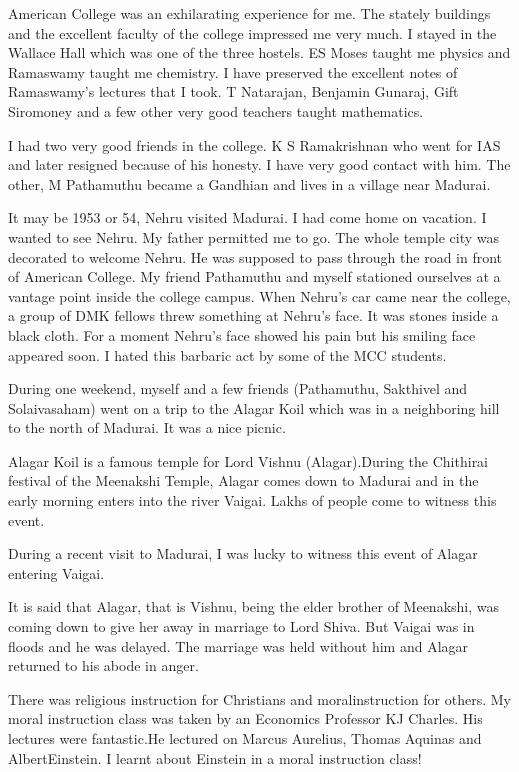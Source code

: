 American College was an exhilarating experience for me. The stately 
buildings and the excellent faculty of the college impressed me very 
much. I stayed in the Wallace Hall which was one of the three hostels. 
ES Moses taught me physics and Ramaswamy taught me chemistry. I have 
preserved the excellent notes of Ramaswa\-my's lectures that I took. T 
Natarajan, Benjamin Guna\-raj, Gift Siromoney and a few other very good 
teachers taught mathematics.

I had two very good friends in the college. K S Ramakrishnan who went 
for IAS and later resigned because of his honesty. I have very good 
contact with him. The other, M Pathamuthu became a Gandhian and lives in 
a village near Madurai.

It may be 1953 or 54, Nehru visited Madurai. I had come home on 
vacation. I wanted to see Nehru. My father permitted me to go. The whole 
temple city was decorated to welcome Nehru. He was supposed to pass 
through the road in front of American College. My friend Pathamuthu and 
myself stationed ourselves at a vantage point inside the college campus. 
When Nehru's car came near the college, a group of DMK fellows threw 
something at Nehru's face. It was stones inside a black cloth. For a 
moment Nehru's face showed his pain but his smiling face appeared soon. 
I hated this barbaric act by some of the MCC students.

During one weekend, myself and a few friends (Pathamuthu, Sakthivel and 
Solaivasaham) went on a trip to the Alagar Koil which was in a 
neighboring hill to the north of Madurai. It was a nice picnic.

Alagar Koil is a famous temple for Lord Vishnu (Alagar).\break During the 
Chithirai festival of the Meenakshi Temple, Alagar comes down to 
Madurai and in the early morning enters into the river Vaigai. Lakhs of 
people come to witness this event.

During a recent visit to Madurai, I was lucky to witness this event of 
Alagar entering Vaigai.

It is said that Alagar, that is Vishnu, being the elder brother of 
Meenakshi, was coming down to give her away in marriage to Lord Shiva. 
But Vaigai was in floods and he was delayed. The marriage was held 
without him and Alagar returned to his abode in anger.
 
There was religious instruction for Christians and moral\break instruction for 
others. My moral instruction class was taken by an Economics Professor 
KJ Charles. His lectures were fantastic.\break He lectured on Marcus Aurelius, 
Thomas Aquinas and Albert\break Einstein. I learnt about Einstein in a moral 
instruction class!

